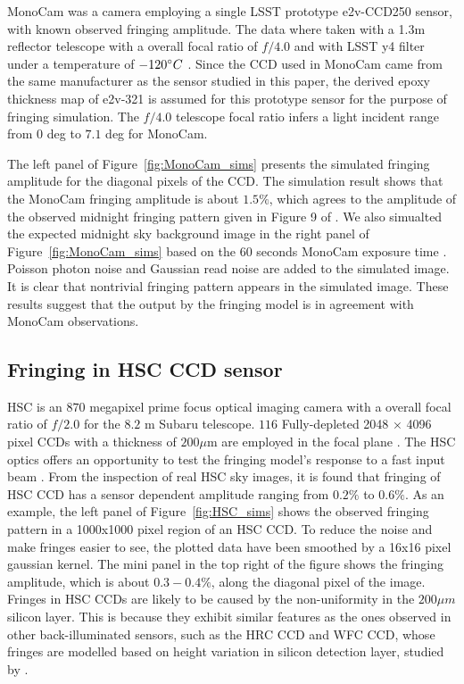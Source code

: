 \documentclass[twocolumn]{aastex63} %
\begin{document}
\begin{CJK*}{UTF8}{gbsn}
MonoCam was a camera employing a single LSST prototype e2v-CCD250 sensor, with known observed fringing amplitude. The data where taken with a 1.3m reflector telescope with a overall focal ratio of $f/4.0$ and with LSST y4 filter under a temperature of $-120\degree C$ \citep{Brooks17}. Since the CCD used in MonoCam came from the same manufacturer as the sensor studied in this paper, the derived epoxy thickness map of e2v-321 is assumed for this prototype sensor for the purpose of fringing simulation. The $f/4.0$ telescope focal ratio infers a light incident range from $0$ deg to $7.1$ deg for MonoCam.

The left panel of Figure~\ref{fig:MonoCam_sims} presents the simulated fringing amplitude for the diagonal pixels of the CCD. The simulation result shows that the MonoCam fringing amplitude is about $1.5\%$, which agrees to the amplitude of the observed midnight fringing pattern given in Figure 9 of \citet{Brooks17}. We also simualted the expected midnight sky background image in the right panel of Figure~\ref{fig:MonoCam_sims} based on the $60$ seconds MonoCam exposure time \citep{Brooks17}. Poisson photon noise and Gaussian read noise are added to the simulated image. It is clear that nontrivial fringing pattern appears in the simulated image. These results suggest that the output by the fringing model is in agreement with MonoCam observations.

\subsection{Fringing in HSC CCD sensor}

HSC is an $870$ megapixel prime focus optical imaging camera with a overall focal ratio of $f/2.0$ for the $8.2$ m Subaru telescope. $116$ Fully-depleted  2048 × 4096 pixel CCDs with a thickness of $200\mu$m are employed in the focal plane \citep{Miyazaki18}. The HSC optics offers an opportunity to test the fringing model's response to a fast input beam . From the inspection of real HSC sky images, it is found that fringing of HSC CCD has a sensor dependent amplitude ranging from $0.2\%$ to $0.6\%$. As an example, the left panel of Figure~\ref{fig:HSC_sims} shows the observed fringing pattern in a 1000x1000 pixel region of an HSC CCD. To reduce the noise and make fringes easier to see, the plotted data have been smoothed by a 16x16 pixel gaussian kernel. The mini panel in the top right of the figure shows the fringing amplitude, which is about $0.3-0.4\%$, along the diagonal pixel of the image. Fringes in HSC CCDs are likely to be caused by the non-uniformity in the $200\mu m$ silicon layer. This is because they exhibit similar features as the ones observed in other back-illuminated sensors, such as the HRC CCD and WFC CCD, whose fringes are modelled based on height variation in silicon detection layer, studied by \citet{Walsh03}. 


\end{CJK*}
\end{document}
